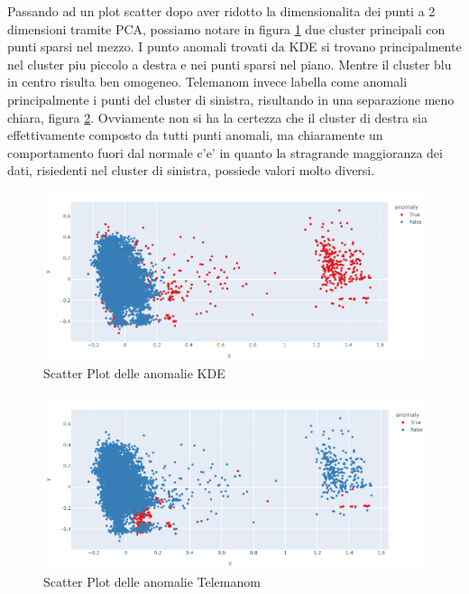 Passando ad un plot scatter dopo aver ridotto la dimensionalita dei punti a 2 dimensioni tramite PCA, possiamo notare in figura \ref{kde_scatter} due cluster principali con punti sparsi nel mezzo. I punto anomali trovati da KDE si trovano principalmente nel cluster piu piccolo a destra e nei punti sparsi nel piano. Mentre il cluster blu in centro risulta ben omogeneo.
Telemanom invece labella come anomali principalmente i punti del cluster di sinistra, risultando in una separazione meno chiara, figura \ref{worst_clf_scatter}.
Ovviamente non si ha la certezza che il cluster di destra sia effettivamente composto da tutti punti anomali, ma chiaramente un comportamento fuori dal normale c'e' in quanto la stragrande maggioranza dei dati, risiedenti nel cluster di sinistra, possiede valori molto diversi.


\begin{figure}[t]
	\centering
	\includegraphics[width=14cm, scale=1]{images/kde_scatter}
	\caption{Scatter Plot delle anomalie KDE}
	\label{kde_scatter}
		
\end{figure}




\begin{figure}[t]
	\centering
	\includegraphics[width=14cm, scale=1]{images/worst_clf_scatter}
	\caption{Scatter Plot delle anomalie Telemanom}
	\label{worst_clf_scatter}
		
\end{figure}

